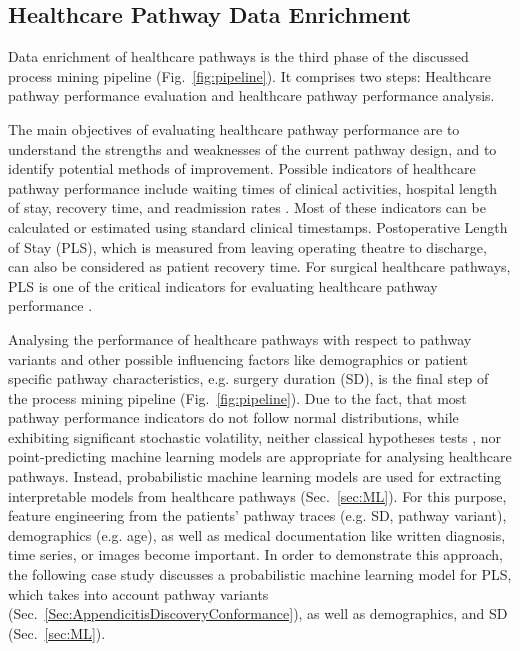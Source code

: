 \subsection{Healthcare Pathway Data Enrichment}
Data enrichment of healthcare pathways is the third phase of the
discussed process mining pipeline (Fig.~\ref{fig:pipeline}).
It comprises two steps: Healthcare pathway performance evaluation and
healthcare pathway performance analysis.

The main objectives of evaluating healthcare pathway performance are
to understand the strengths and weaknesses of the current pathway design,
and to identify potential methods of improvement. Possible indicators
of healthcare pathway performance include waiting times of clinical
activities, hospital length of stay, recovery time, and readmission
rates \cite{Rotter2008_pathways}.
Most of these indicators can be calculated or estimated using standard clinical timestamps. Postoperative Length of Stay (PLS), which is measured from leaving operating theatre to discharge, can also be considered as patient recovery time.
For surgical healthcare pathways,  PLS is one of the critical indicators for evaluating healthcare pathway
performance \cite{Pearson2001_pathways}. 

Analysing the performance of healthcare pathways with respect to
pathway variants and other possible influencing factors like
demographics or patient specific pathway characteristics, e.g. surgery duration (SD), is the final step of the process mining pipeline
(Fig.~\ref{fig:pipeline}).
Due to the fact, that most pathway performance indicators do not
follow normal distributions, while exhibiting significant stochastic
volatility, neither classical hypotheses tests \cite{Goodman2008_p-value}, nor point-predicting
machine learning models are appropriate for analysing healthcare
pathways.
Instead, probabilistic machine learning models
\cite{Ghahramani2015_PML} are used for extracting interpretable models
from healthcare pathways (Sec.~\ref{sec:ML}).
For this purpose, feature engineering \cite{DongLiu2018_FE} from
the patients' pathway traces (e.g. SD, pathway variant),
demographics (e.g. age), as well as medical documentation like written
diagnosis, time series, or images become important.
In order to demonstrate this approach, the following case study
discusses a probabilistic machine learning model for PLS, which
takes into account pathway variants
(Sec.~\ref{Sec:AppendicitisDiscoveryConformance}), as well as demographics, and
SD (Sec.~\ref{sec:ML}).

